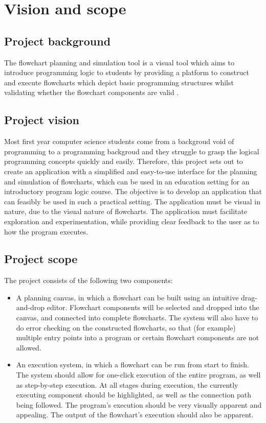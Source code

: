 \documentclass[11pt,a4paper,titlepage]{article}
\begin{document}


\newpage
\tableofcontents


\pagebreak

\section{Vision and scope}
\subsection{Project background}
The flowchart planning and simulation  tool is a visual tool which aims to introduce programming logic to students by providing  a platform to construct  and execute  flowcharts which depict basic programming structures whilst validating whether the flowchart components are valid .

\subsection{Project vision}

Most first year computer science students come from a backgroud void of programming to a programming backgroud 
and they struggle to grasp the logical programming concepts quickly and easily.
Therefore, this project sets out to create an application with a simplified and easy-to-use interface for the planning and simulation of flowcharts, which
can be used in an education setting for an introductory program logic course. The objective is to
develop an application that can feasibly be used in such a practical setting. The application must be
visual in nature, due to the visual nature of flowcharts. The application must facilitate exploration
and experimentation, while providing clear feedback to the user as to how the program executes.

\subsection{Project scope}

The project consists of the following two components:

\begin{itemize}
\item A planning canvas, in which a flowchart can be built using an intuitive drag-and-drop editor.
Flowchart components will be selected and dropped into the canvas, and connected into
complete flowcharts. The system will also have to do error checking on the constructed
flowcharts, so that (for example) multiple entry points into a program or certain flowchart
components are not allowed.
\item An execution system, in which a flowchart can be run from start to finish. The system
should allow for one-click execution of the entire program, as well as step-by-step
execution. At all stages during execution, the currently executing component should be
highlighted, as well as the connection path being followed. The program's execution should
be very visually apparent and appealing. The output of the flowchart's execution should also
be apparent.
\end{itemize}
\end{document}
